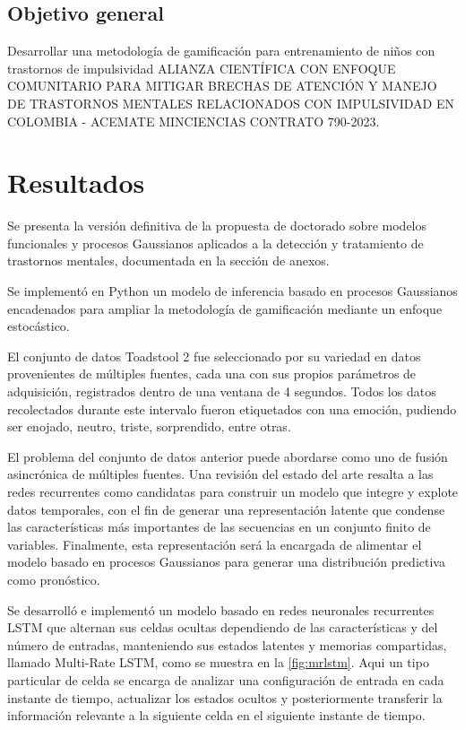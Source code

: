 \documentclass[10pt,xcdraw, spanish]{article}
\begin{document}
	\subsection{Objetivo general}
	Desarrollar una metodología de gamificación para entrenamiento de niños con trastornos de impulsividad ALIANZA CIENTÍFICA CON ENFOQUE COMUNITARIO PARA MITIGAR BRECHAS DE ATENCIÓN Y MANEJO DE TRASTORNOS MENTALES RELACIONADOS CON IMPULSIVIDAD EN COLOMBIA - ACEMATE MINCIENCIAS CONTRATO 790-2023.
	
%	
	
	
%	
	
	\section{Resultados}
	Se presenta la versión definitiva de la propuesta de doctorado sobre modelos funcionales y procesos Gaussianos aplicados a la detección y tratamiento de trastornos mentales, documentada en la sección de anexos.
	
	Se implementó en Python un modelo de inferencia basado en procesos Gaussianos encadenados para ampliar la metodología de gamificación mediante un enfoque estocástico.
	
	El conjunto de datos Toadstool 2 fue seleccionado por su variedad en datos provenientes de múltiples fuentes, cada una con sus propios parámetros de adquisición, registrados dentro de una ventana de 4 segundos. Todos los datos recolectados durante este intervalo fueron etiquetados con una emoción, pudiendo ser enojado, neutro, triste, sorprendido, entre otras.
	
	El problema del conjunto de datos anterior puede abordarse como uno de fusión asincrónica de múltiples fuentes. Una revisión del estado del arte resalta a las redes recurrentes como candidatas para construir un modelo que integre y explote datos temporales, con el fin de generar una representación latente que condense las características más importantes de las secuencias en un conjunto finito de variables. Finalmente, esta representación será la encargada de alimentar el modelo basado en procesos Gaussianos para generar una distribución predictiva como pronóstico.
	
	Se desarrolló e implementó un modelo basado en redes neuronales recurrentes LSTM que alternan sus celdas ocultas dependiendo de las características y del número de entradas, manteniendo sus estados latentes y memorias compartidas, llamado Multi-Rate LSTM, como se muestra en la \cref{fig:mrlstm}. Aqui un tipo particular de celda se encarga de analizar una configuración de entrada en cada instante de tiempo, actualizar los estados ocultos y posteriormente transferir la información relevante a la siguiente celda en el siguiente instante de tiempo.
	
\end{document}
